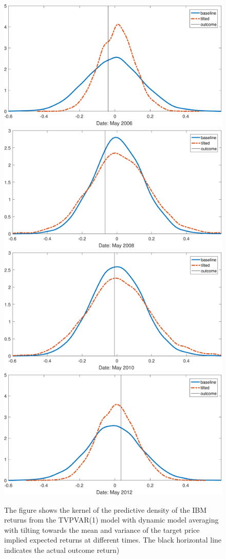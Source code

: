 \begin{figure}
	\centering
	\includegraphics[width=0.49\linewidth]{../plots/IBM_density_mv1}
	\includegraphics[width=0.49\linewidth]{../plots/IBM_density_mv2}\\
	\includegraphics[width=0.49\linewidth]{../plots/IBM_density_mv3}
	\includegraphics[width=0.49\linewidth]{../plots/IBM_density_mv4}
	\caption[Kernel estimates of predictive density of the IBM returns from the TVPVAR(1) with dynamic model averaging and tilting towards the mean and variance of monthly target price implied expected returns]{The figure shows the kernel of the predictive density of the IBM returns from the TVPVAR(1) model with dynamic model averaging with tilting towards the mean and variance of the target price implied expected returns at different times. The black horizontal line indicates the actual outcome return)}
	\label{fig:ibmdensitymv}
\end{figure}

\newpage\clearpage


